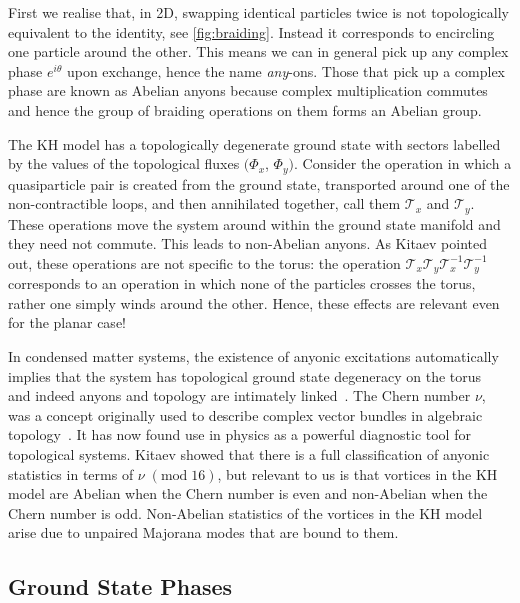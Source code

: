 First we realise that, in 2D, swapping identical particles twice is not topologically equivalent to the identity, see \cref{fig:braiding}. Instead it corresponds to encircling one particle around the other. This means we can in general pick up any complex phase \(e^{i\theta}\) upon exchange, hence the name \emph{any}-ons. Those that pick up a complex phase are known as Abelian anyons because complex multiplication commutes and hence the group of braiding operations on them forms an Abelian group.

The KH model has a topologically degenerate ground state with sectors labelled by the values of the topological fluxes \((\Phi_x\), \(\Phi_y)\). Consider the operation in which a quasiparticle pair is created from the ground state, transported around one of the non-contractible loops, and then annihilated together, call them \(\mathcal{T}_{x}\) and \(\mathcal{T}_{y}\). These operations move the system around within the ground state manifold and they need not commute. This leads to non-Abelian anyons. As Kitaev pointed out, these operations are not specific to the torus: the operation \(\mathcal{T}_{x}\mathcal{T}_{y}\mathcal{T}_{x}^{-1}\mathcal{T}_{y}^{-1}\) corresponds to an operation in which none of the particles crosses the torus, rather one simply winds around the other. Hence, these effects are relevant even for the planar case!

In condensed matter systems, the existence of anyonic excitations automatically implies that the system has topological ground state degeneracy on the torus~\autocite{einarssonFractionalStatisticsTorus1990} and indeed anyons and topology are intimately linked~\autocite{oshikawaTopologicalDegeneracyNonAbelian2007,Chung_Topological_quantum2010,yaoAlgebraicSpinLiquid2009}. The Chern number \(\nu\), was a concept originally used to describe complex vector bundles in algebraic topology~\autocite{chernCharacteristicClassesHermitian1946}. It has now found use in physics as a powerful diagnostic tool for topological systems. Kitaev showed that there is a full classification of anyonic statistics in terms of \(\nu\;(\mathrm{mod}\;16)\), but relevant to us is that vortices in the KH model are Abelian when the Chern number is even and non-Abelian when the Chern number is odd. Non-Abelian statistics of the vortices in the KH model arise due to unpaired Majorana modes that are bound to them.

\hypertarget{ground-state-phases}{%
\subsection{Ground State Phases}\label{ground-state-phases}}

